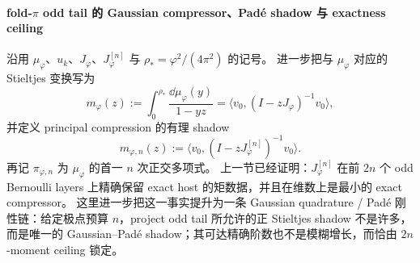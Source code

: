 \paragraph{fold-\texorpdfstring{$\pi$}{pi} odd tail 的 Gaussian compressor、Pad\'e shadow 与 exactness ceiling}
沿用 \(\mu_\varphi\)、\(u_k\)、\(J_\varphi\)、\(J_\varphi^{[n]}\) 与 \(\rho_\ast=\varphi^2/(4\pi^2)\) 的记号。
进一步把与 \(\mu_\varphi\) 对应的 Stieltjes 变换写为
\[
m_\varphi(z)
:=
\int_{0}^{\rho_\ast}\frac{\dd\mu_\varphi(y)}{1-yz}
=
\langle v_0,(I-zJ_\varphi)^{-1}v_0\rangle,
\]
并定义 principal compression 的有理 shadow
\[
m_{\varphi,n}(z)
:=
\langle v_0,(I-zJ_\varphi^{[n]})^{-1}v_0\rangle.
\]
再记 \(\pi_{\varphi,n}\) 为 \(\mu_\varphi\) 的首一 \(n\) 次正交多项式。
上一节已经证明：\(J_\varphi^{[n]}\) 在前 \(2n\) 个 odd Bernoulli layers 上精确保留 exact host 的矩数据，并且在维数上是最小的 exact compressor。
这里进一步把这一事实提升为一条 Gaussian quadrature / Pad\'e 刚性链：给定极点预算 \(n\)，project odd tail 所允许的正 Stieltjes shadow 不是许多，而是唯一的 Gaussian--Pad\'e shadow；其可达精确阶数也不是模糊增长，而恰由 \(2n\)-moment ceiling 锁定。

